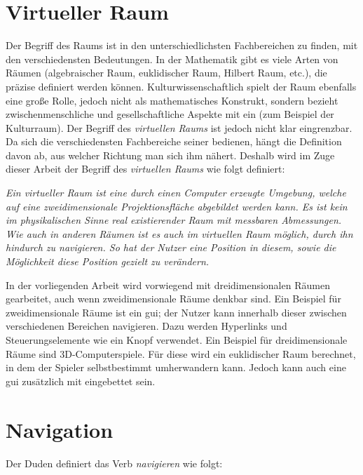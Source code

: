 \section{Virtueller Raum}
Der Begriff des Raums ist in den unterschiedlichsten Fachbereichen zu finden, mit den verschiedensten Bedeutungen.
In der Mathematik gibt es viele Arten von Räumen (algebraischer Raum, euklidischer Raum, Hilbert Raum, etc.), die präzise definiert werden können.
Kulturwissenschaftlich spielt der Raum ebenfalls eine große Rolle, jedoch nicht als mathematisches Konstrukt, sondern bezieht zwischenmenschliche und gesellschaftliche Aspekte mit ein (zum Beispiel der Kulturraum).
Der Begriff des \textit{virtuellen Raums} ist jedoch nicht klar eingrenzbar.
Da sich die verschiedensten Fachbereiche seiner bedienen, hängt die Definition davon ab, aus welcher Richtung man sich ihm nähert.
Deshalb wird im Zuge dieser Arbeit der Begriff des \textit{virtuellen Raums} wie folgt definiert:

\textit{Ein virtueller Raum ist eine durch einen Computer erzeugte Umgebung, welche auf eine zweidimensionale Projektionsfläche abgebildet werden kann.
    Es ist kein im physikalischen Sinne real existierender Raum mit messbaren Abmessungen.
    Wie auch in anderen Räumen ist es auch im virtuellen Raum möglich, durch ihn hindurch zu navigieren.
    So hat der Nutzer eine Position in diesem, sowie die Möglichkeit diese Position gezielt zu verändern.}

In der vorliegenden Arbeit wird vorwiegend mit dreidimensionalen Räumen gearbeitet, auch wenn zweidimensionale Räume denkbar sind.
Ein Beispiel für zweidimensionale Räume ist ein \ac{gui}; der Nutzer kann innerhalb dieser zwischen verschiedenen Bereichen navigieren.
Dazu werden Hyperlinks und Steuerungselemente wie ein Knopf verwendet.
Ein Beispiel für dreidimensionale Räume sind 3D-Computerspiele.
Für diese wird ein euklidischer Raum berechnet, in dem der Spieler selbstbestimmt umherwandern kann.
Jedoch kann auch eine \ac{gui} zusätzlich mit eingebettet sein.

\section{Navigation}
Der Duden definiert das Verb \textit{navigieren} wie folgt:

